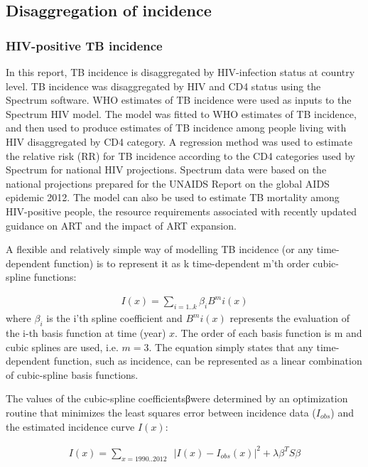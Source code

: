 \subsection{Disaggregation of incidence}
\subsubsection{HIV-positive TB incidence}

In this report, TB incidence is disaggregated by HIV-infection status at country level. TB incidence was disaggregated by HIV and CD4 status using the Spectrum software\cite{Stover2012}. WHO estimates of TB incidence were used as inputs to the Spectrum HIV model. The model was fitted to WHO estimates of TB incidence, and then used to produce estimates of TB incidence among people living with HIV disaggregated by CD4 category\cite{Pretorius2014}. A regression method was used to estimate the relative risk (RR) for TB incidence according to the CD4 categories used by Spectrum for national HIV projections\cite{J2010}. Spectrum data were based on the national projections prepared for the UNAIDS Report on the global AIDS epidemic 2012. The model can also be used to  estimate TB mortality among HIV-positive people, the resource requirements associated with  recently updated guidance on ART and the impact of ART expansion. 

A flexible and relatively simple way of modelling TB incidence (or any time-dependent function) is to represent it as k time-dependent m’th order cubic-spline functions:

\begin{align*}
I(x) = \sum_{i=1 .. k} \beta_i B^m i(x)
\end{align*}
where $\beta_i$ is the i'th spline coefficient and $B^m i(x)$ represents the evaluation of the i-th basis function at time (year) $x$. The order of each basis function is m and cubic splines are used, i.e. $m=3$. The equation simply states that any time-dependent function, such as incidence, can be represented as a linear combination of cubic-spline basis functions.

The values of the cubic-spline coefficientsβwere determined by an optimization routine that minimizes the least squares error between incidence data ($I_{obs}$) and the estimated incidence curve $I(x)$:

\begin{align*}
I(x) = \sum_{x = 1990 .. 2012} \enspace | I(x) - I_{obs} (x)|^2 + \lambda \beta^T S \beta
\end{align*}

